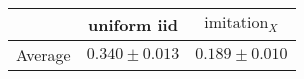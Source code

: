 \begin{tabular}{lcc}
\toprule
 & uniform iid & $\text{imitation}_X$ \\
\midrule
Average & $0.340 \pm 0.013$ & $0.189 \pm 0.010$ \\
\bottomrule
\end{tabular}
